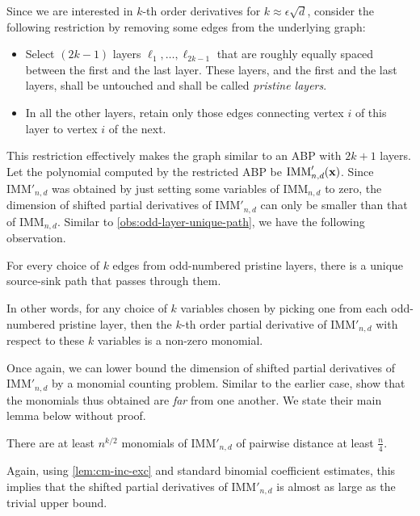 Since we are interested in $k$-th order derivatives for $k \approx \epsilon \sqrt{d}$, \cite{FLMS13} consider the following restriction by removing some edges from the underlying graph:
\begin{itemize}
\item Select $(2k-1)$ layers $\ell_1,\dots, \ell_{2k-1}$ that are roughly equally spaced between the first and the last layer. 
These layers, and the first and the last layers, shall be untouched and shall be called \emph{pristine layers}.
\item In all the other layers, retain only those edges connecting vertex $i$ of this layer to vertex $i$  of the next. 
\end{itemize}
This restriction effectively makes the graph similar to an ABP with $2k+1$ layers. 
Let the polynomial computed by the restricted ABP be $\mathrm{IMM}'_{n,d}(\mathbf{x})$. 
Since $\mathrm{IMM}'_{n,d}$ was obtained by just setting some variables of $\mathrm{IMM}_{n,d}$ to zero, the dimension of shifted partial derivatives of $\mathrm{IMM}'_{n,d}$ can only be smaller than that of $\mathrm{IMM}_{n,d}$. 
Similar to \autoref{obs:odd-layer-unique-path}, we have the following observation. 

\begin{observation}
For every choice of $k$ edges from odd-numbered pristine layers, there is a unique source-sink path that passes through them. 

In other words, for any choice of $k$ variables chosen by picking one from each odd-numbered pristine layer, then the $k$-th order partial derivative of $\mathrm{IMM}'_{n,d}$ with respect to these $k$ variables is a non-zero monomial. 
\end{observation}

Once again, we can lower bound the dimension of shifted partial derivatives of $\mathrm{IMM}'_{n,d}$ by a monomial counting problem. 
Similar to the earlier case, \cite{FLMS13} show that the monomials thus obtained are \emph{far} from one another. 
We state their main lemma below without proof. 

\begin{lemma}
There are at least $n^{k/2}$ monomials of $\mathrm{IMM}'_{n,d}$ of pairwise distance at least $\frac{n}{4}$. 
\end{lemma}

Again, using \autoref{lem:cm-inc-exc} and standard binomial coefficient estimates, this implies that the shifted partial derivatives of $\mathrm{IMM}'_{n,d}$ is almost as large as the trivial upper bound. 

